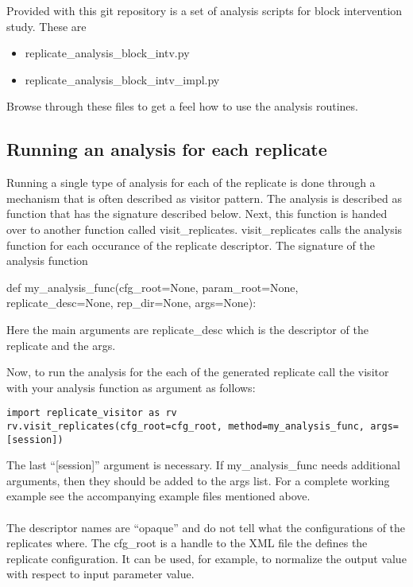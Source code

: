 \documentclass[11]{report}
\begin{document}
Provided with this git repository is a set of analysis scripts for block intervention study. These are
\begin{itemize}
\item replicate\_analysis\_block\_intv.py
\item replicate\_analysis\_block\_intv\_impl.py
\end{itemize}

Browse through these files to get a feel how to use the analysis routines. 


\subsection{Running an analysis for each replicate}
Running a single type of analysis for each of the replicate is done through a mechanism that is often described as visitor pattern. 
The analysis is described as function that has the signature described below. 
Next, this function is handed over to another function called visit\_replicates.
visit\_replicates calls the analysis function for each occurance of the replicate descriptor. 
The signature of the analysis function
\begin{code}
def my_analysis_func(cfg_root=None, param_root=None, replicate_desc=None, rep_dir=None, args=None):
\end{code}
Here the main arguments are replicate\_desc which is the descriptor of the replicate and
the args. 

Now, to run the analysis for the each of the generated replicate call the visitor with your analysis function as argument as follows:
\begin{verbatim}
import replicate_visitor as rv
rv.visit_replicates(cfg_root=cfg_root, method=my_analysis_func, args=[session])
\end{verbatim}
The last ``[session]'' argument is necessary. If my\_analysis\_func needs additional arguments, then they should be added to the args list. For a complete working example see the accompanying example files mentioned above. 

\paragraph{}\hfill
The descriptor names are ``opaque'' and do not tell what the configurations of the replicates where. The cfg\_root is a handle to the XML file the defines the replicate configuration. It can be used, for example, to normalize the output value with respect to input parameter value.
\end{document}
